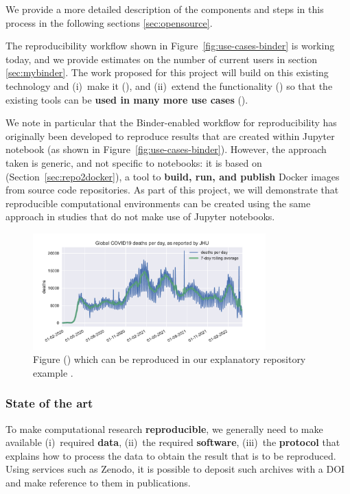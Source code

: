 We provide a more detailed description of the components and steps in this
process in the following sections \ref{sec:opensource}.

The reproducibility workflow shown in Figure~\ref{fig:use-cases-binder} is
working today, and we provide estimates on the number of current users in
section \ref{sec:mybinder}. The work proposed for this project will build on
this existing technology and (i)~make it 
(), and (ii)~extend the functionality () so
that the existing tools can be \textbf{used in many more use cases}
().

We note in particular that the Binder-enabled workflow for reproducibility has
originally been developed to reproduce results that are created within Jupyter
notebook (as shown in Figure~\ref{fig:use-cases-binder}).
However, the approach taken is generic, and not specific to notebooks: it is
based on \repotodocker (Section~\ref{sec:repo2docker}), a tool to \textbf{build, run, and
publish} Docker images from source code repositories.
As part of this project, we will demonstrate that reproducible
computational environments can be created using the same approach
in studies that do not make use of Jupyter notebooks.

\begin{figure}
  \centering
  \includegraphics[width=0.8\textwidth]{images/figure1.pdf}
  \caption{Figure () which can be reproduced in our explanatory repository example
    \cite{ReproducibilityRepositoryExample2022}. \label{fig:reproducibility-example-covid}}
\end{figure}


\subsubsection{State of the art}

To make computational research \textbf{reproducible}, we generally need to make available
(i)~required \textbf{data}, (ii)~the required \textbf{software}, (iii)~the \textbf{protocol} that explains
how to process the data to obtain the result that is to be reproduced. Using
services such as Zenodo, it is possible to deposit such archives with a DOI and
make reference to them in publications.

